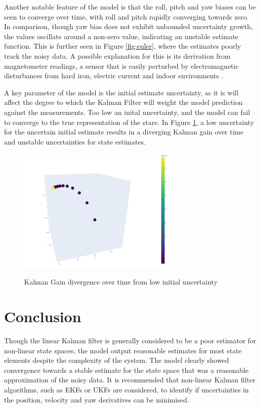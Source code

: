 \documentclass[12pt]{article}
\begin{document}
Another notable feature of the model is that the roll, pitch and yaw biases can be seen to converge over time, with roll and pitch rapidly converging towards zero. In comparison, though yaw bias does not exhibit unbounded uncertainty growth, the values oscillate around a non-zero value, indicating an unstable estimate function. This is further seen in Figure \ref{fig:euler}, where the estimates poorly track the noisy data. A possible explanation for this is its derivation from magnetometer readings, a sensor that is easily perturbed by  electromagnetic disturbances from hard iron, electric current and indoor environments \cite{wu2019real}. 

A key parameter of the model is the initial estimate uncertainty, as it is will affect the degree to which the Kalman Filter will weight the model prediction against the measurements. Too low an inital uncertainty, and the model can fail to converge to the true representation of the stare. In Figure \ref{fig:gain_u}, a low uncertainty for the uncertain initial estimate results in a diverging Kalman gain over time and unstable uncertainties for state estimates.

\begin{figure}[H]
    \centering
    \includegraphics[width=300px]{figures/kalman_gain_low_uncertainty.png}\\
    \caption{Kalman Gain divergence over time from low initial uncertainty}
    \label{fig:gain_u}
\end{figure}

\section{Conclusion}
Though the linear Kalman filter is generally considered to be a poor estimator for non-linear state spaces, the model output reasonable estimates for most state elements despite the complexity of the system. The model clearly showed convergence towards a stable estimate for the state space that was a reasonable approximation of the noisy data. It is recommended that non-linear Kalman filter algorithms, such as EKFs or UKFs are considered, to identify if uncertainties in the position, velocity and yaw derivatives can be minimised. 
\end{document}
